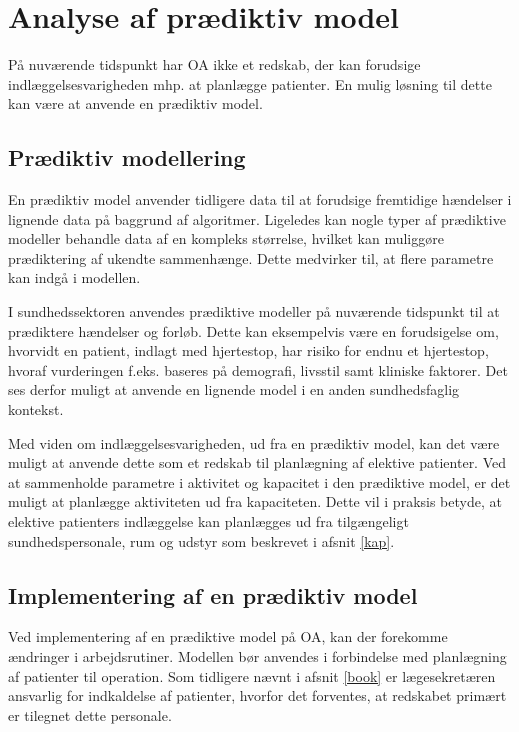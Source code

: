 \chapter{Analyse af prædiktiv model}
På nuværende tidspunkt har OA ikke et redskab, der kan forudsige indlæggelsesvarigheden mhp. at planlægge patienter.
En mulig løsning til dette kan være at anvende en prædiktiv model. 


\section{Prædiktiv modellering} \label{praemodel}
En prædiktiv model anvender tidligere data til at forudsige fremtidige hændelser i lignende data på baggrund af algoritmer. Ligeledes kan nogle typer af prædiktive modeller behandle data af en kompleks størrelse, hvilket kan muliggøre prædiktering af ukendte sammenhænge. Dette medvirker til, at flere parametre kan indgå i modellen.\cite{Kuhn2013}


I sundhedssektoren anvendes prædiktive modeller på nuværende tidspunkt til at prædiktere hændelser og forløb. Dette kan eksempelvis være en forudsigelse om, hvorvidt en patient, indlagt med hjertestop, har risiko for endnu et hjertestop, hvoraf vurderingen f.eks. baseres på demografi, livsstil samt kliniske faktorer\cite{Hastie2008}. Det ses derfor muligt at anvende en lignende model i en anden sundhedsfaglig kontekst.


Med viden om indlæggelsesvarigheden, ud fra en prædiktiv model, kan det være muligt at anvende dette som et redskab til planlægning af elektive patienter. Ved at sammenholde parametre i aktivitet og kapacitet i den prædiktive model, er det muligt at planlægge aktiviteten ud fra kapaciteten. Dette vil i praksis betyde, at elektive patienters indlæggelse kan planlægges ud fra tilgængeligt sundhedspersonale, rum og udstyr som beskrevet i afsnit \ref{kap}. 


\section{Implementering af en prædiktiv model}
Ved implementering af en prædiktive model på OA, kan der forekomme ændringer i arbejdsrutiner. Modellen bør anvendes i forbindelse med planlægning af patienter til operation. Som tidligere nævnt i afsnit \ref{book} er lægesekretæren ansvarlig for indkaldelse af patienter, hvorfor det forventes, at redskabet primært er tilegnet dette personale.


